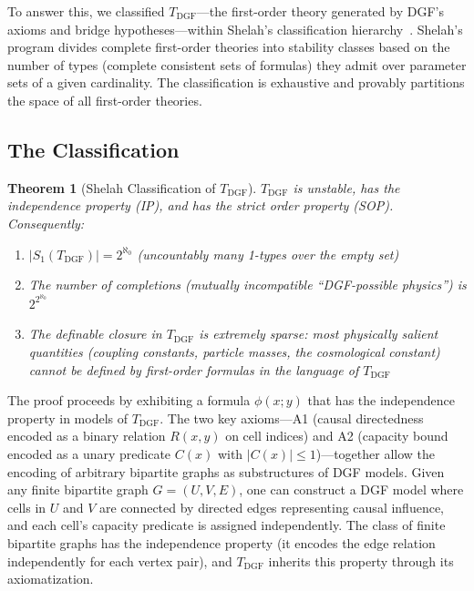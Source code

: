 \documentclass[12pt,a4paper]{article}
\newtheorem{theorem}{Theorem}[section]
\theoremstyle{definition}
\theoremstyle{remark}
\begin{document}
To answer this, we classified $T_{\mathrm{DGF}}$---the first-order theory generated by DGF's axioms and bridge hypotheses---within Shelah's classification hierarchy~\cite{Shelah1990,Marker2002}. Shelah's program divides complete first-order theories into stability classes based on the number of types (complete consistent sets of formulas) they admit over parameter sets of a given cardinality. The classification is exhaustive and provably partitions the space of all first-order theories.

\subsection{The Classification}

\begin{theorem}[Shelah Classification of $T_{\mathrm{DGF}}$]
\label{thm:shelah}
$T_{\mathrm{DGF}}$ is unstable, has the independence property (IP), and has the strict order property (SOP). Consequently:
\begin{enumerate}[leftmargin=*,itemsep=0pt,topsep=0pt]
\item $|S_1(T_{\mathrm{DGF}})| = 2^{\aleph_0}$ (uncountably many 1-types over the empty set)
\item The number of completions (mutually incompatible ``DGF-possible physics'') is $2^{2^{\aleph_0}}$
\item The definable closure in $T_{\mathrm{DGF}}$ is extremely sparse: most physically salient quantities (coupling constants, particle masses, the cosmological constant) cannot be defined by first-order formulas in the language of $T_{\mathrm{DGF}}$
\end{enumerate}
\end{theorem}

The proof proceeds by exhibiting a formula $\phi(x;y)$ that has the independence property in models of $T_{\mathrm{DGF}}$. The two key axioms---A1 (causal directedness encoded as a binary relation $R(x,y)$ on cell indices) and A2 (capacity bound encoded as a unary predicate $C(x)$ with $|C(x)| \leq 1$)---together allow the encoding of arbitrary bipartite graphs as substructures of DGF models. Given any finite bipartite graph $G=(U,V,E)$, one can construct a DGF model where cells in $U$ and $V$ are connected by directed edges representing causal influence, and each cell's capacity predicate is assigned independently. The class of finite bipartite graphs has the independence property (it encodes the edge relation independently for each vertex pair), and $T_{\mathrm{DGF}}$ inherits this property through its axiomatization.
\end{document}
